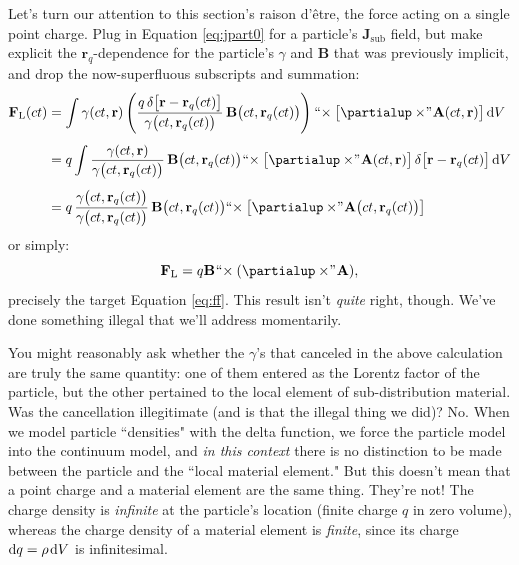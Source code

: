 \documentclass[12pt]{article}
\renewcommand{\vv}[1]{\mathbf{#1}}
\newcommand{\dd}[1]{\mathrm{d}#1}
\begin{document}
Let's turn our attention to this section's raison d'\^etre, the force acting on a single point charge. Plug in Equation \ref{eq:jpart0} for a particle's $\vv J_{\mathrm{sub}}$ field, but make explicit the $\vv r_q$-dependence for the particle's $\gamma$ and $\vv B$ that was previously implicit, and drop the now-superfluous subscripts and summation:
\begin{equation*}
\begin{aligned}
\vv F_{\mathrm{L}} (ct) &= \int \gamma(ct, \vv r) \left( \dfrac{q \, \delta \big[ \vv r - \vv r_q (ct) \big]}{\gamma \big( ct, \vv r_q (ct) \big)} \, \vv B \big( ct, \vv r_q (ct) \big) \right) \mkern1mu `` \mkern-4mu \times \big[ \partialup \times \mkern-4mu " \mkern1mu \vv A(ct, \vv r) \big]  \, \dd V \\[4pt]
&= q \int \dfrac{\gamma(ct, \vv r)}{\gamma \big( ct, \vv r_q (ct) \big)} \, \vv B \big( ct, \vv r_q (ct) \big) \mkern1mu `` \mkern-4mu \times \big[ \partialup \times \mkern-4mu " \mkern1mu \vv A(ct, \vv r) \big] \, \delta \big[ \vv r - \vv r_q (ct) \big] \, \dd V \\[4pt]
&= q \, \dfrac{\gamma \big( ct, \vv r_q (ct) \big)}{\gamma \big( ct, \vv r_q (ct) \big)} \, \vv B \big( ct, \vv r_q (ct) \big) `` \mkern-4mu \times \big[ \partialup \times \mkern-4mu " \mkern1mu \vv A \big( ct, \vv r_q (ct) \big) \big]
\end{aligned}
\end{equation*}
or simply:
\begin{equation*}
\vv F_{\textrm{L}} = q \vv B \mkern1mu `` \mkern-4mu \times (\partialup \times \mkern-4mu " \mkern1mu \vv A) ,
\end{equation*}
precisely the target Equation \ref{eq:ff}. This result isn't \emph{quite} right, though. We've done something illegal that we'll address momentarily.

You might reasonably ask whether the $\gamma$'s that canceled in the above calculation are truly the same quantity: one of them entered as the Lorentz factor of the particle, but the other pertained to the local element of sub-distribution material. Was the cancellation illegitimate (and is that the illegal thing we did)? No. When we model particle ``densities" with the delta function, we force the particle model into the continuum model, and \emph{in this context} there is no distinction to be made between the particle and the ``local material element." But this doesn't mean that a point charge and a material element are the same thing. They're not! The charge density is \emph{infinite} at the particle's location (finite charge $q$ in zero volume), whereas the charge density of a material element is \emph{finite}, since its charge $\dd q = \rho \mkern2mu \dd V$ is infinitesimal.
\end{document}

